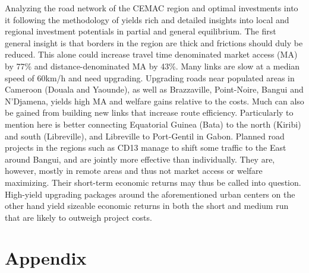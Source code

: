 \documentclass[a4paper]{article}
\begin{document}
Analyzing the road network of the CEMAC region and optimal investments into it following the methodology of \citet{krantz2024optimal} yields rich and detailed insights into local and regional investment potentials in partial and general equilibrium. The first general insight is that borders in the region are thick and frictions should duly be reduced. This alone could increase travel time denominated market access (MA) by 77\% and distance-denominated MA by 43\%. Many links are slow at a median speed of 60km/h and need upgrading. Upgrading roads near populated areas in Cameroon (Douala and Yaounde), as well as Brazzaville, Point-Noire, Bangui and N'Djamena, yields high MA and welfare gains relative to the costs. Much can also be gained from building new links that increase route efficiency. Particularly to mention here is better connecting Equatorial Guinea (Bata) to the north (Kiribi) and south (Libreville), and Libreville to Port-Gentil in Gabon. Planned road projects in the regions such as CD13 manage to shift some traffic to the East around Bangui, and are jointly more effective than individually. They are, however, mostly in remote areas and thus not market access or welfare maximizing. Their short-term economic returns may thus be called into question. High-yield upgrading packages around the aforementioned urban centers on the other hand yield sizeable economic returns in both the short and medium run that are likely to outweigh project costs.  %


\newpage



\newpage
\section*{Appendix}
\end{document}
